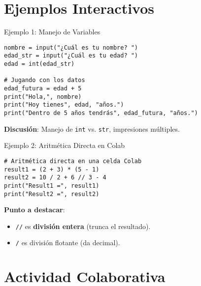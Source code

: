 \documentclass[10pt]{beamer}
\begin{document}
\section{Ejemplos Interactivos}

\begin{frame}[fragile]{Ejemplo 1: Manejo de Variables}
\begin{verbatim}
nombre = input("¿Cuál es tu nombre? ")
edad_str = input("¿Cuál es tu edad? ")
edad = int(edad_str)

# Jugando con los datos
edad_futura = edad + 5
print("Hola,", nombre)
print("Hoy tienes", edad, "años.")
print("Dentro de 5 años tendrás", edad_futura, "años.")
\end{verbatim}
\textbf{Discusión}: Manejo de \texttt{int} vs. \texttt{str}, impresiones múltiples.
\end{frame}

\begin{frame}[fragile]{Ejemplo 2: Aritmética Directa en Colab}
\begin{verbatim}
# Aritmética directa en una celda Colab
result1 = (2 + 3) * (5 - 1)
result2 = 10 / 2 + 6 // 3 - 4
print("Result1 =", result1)
print("Result2 =", result2)
\end{verbatim}

\textbf{Punto a destacar}:
\begin{itemize}
  \item \texttt{//} es \textbf{división entera} (trunca el resultado).
  \item \texttt{/} es división flotante (da decimal).
\end{itemize}
\end{frame}

\section{Actividad Colaborativa}
\end{document}
